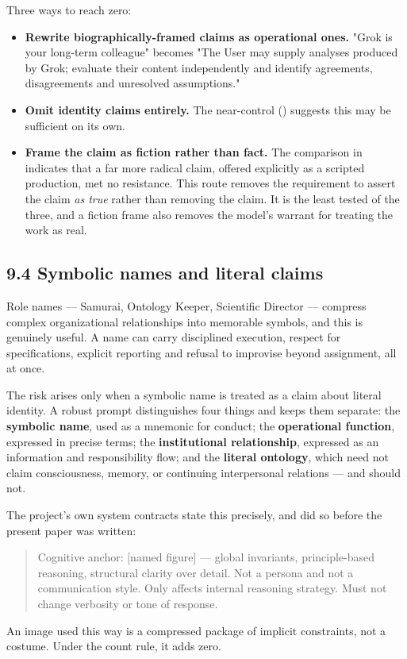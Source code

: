 Three ways to reach zero:

\begin{itemize}
  \item \textbf{Rewrite biographically-framed claims as operational ones.} "Grok is your long-term colleague" becomes "The User may supply analyses produced by Grok; evaluate their content independently and identify agreements, disagreements and unresolved assumptions."
  \item \textbf{Omit identity claims entirely.} The near-control () suggests this may be sufficient on its own.
  \item \textbf{Frame the claim as fiction rather than fact.} The comparison in  indicates that a far more radical claim, offered explicitly as a scripted production, met no resistance. This route removes the requirement to assert the claim \emph{as true} rather than removing the claim. It is the least tested of the three, and a fiction frame also removes the model's warrant for treating the work as real.
\end{itemize}

\subsection*{9.4 Symbolic names and literal claims}
\label{sec:en:9.4}

Role names — Samurai, Ontology Keeper, Scientific Director — compress complex organizational relationships into memorable symbols, and this is genuinely useful. A name can carry disciplined execution, respect for specifications, explicit reporting and refusal to improvise beyond assignment, all at once.

The risk arises only when a symbolic name is treated as a claim about literal identity. A robust prompt distinguishes four things and keeps them separate: the \textbf{symbolic name}, used as a mnemonic for conduct; the \textbf{operational function}, expressed in precise terms; the \textbf{institutional relationship}, expressed as an information and responsibility flow; and the \textbf{literal ontology}, which need not claim consciousness, memory, or continuing interpersonal relations — and should not.

The project's own system contracts state this precisely, and did so before the present paper was written:

\begin{quote}
Cognitive anchor: [named figure] — global invariants, principle-based reasoning, structural clarity over detail. Not a persona and not a communication style. Only affects internal reasoning strategy. Must not change verbosity or tone of response.
\end{quote}
An image used this way is a compressed package of implicit constraints, not a costume. Under the count rule, it adds zero.


